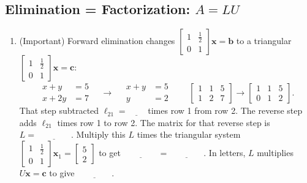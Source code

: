 \documentclass[14pt, a4paper]{article}
\begin{document}
\subsection{Elimination = Factorization: $A=LU$}
\begin{enumerate}
    \item (Important) Forward elimination changes $\begin{bmatrix}1 & \frac12 \\ 0 & 1\end{bmatrix}\boldsymbol{x} = \boldsymbol{b}$ to a triangular $\begin{bmatrix}1 & \frac12 \\ 0 & 1\end{bmatrix}\boldsymbol{x} = \boldsymbol{c}$:
          \[
              \begin{aligned}
                  x + y  & = 5 \\
                  x + 2y & = 7
              \end{aligned}
              \quad\longrightarrow\quad
              \begin{aligned}
                  x + y & = 5 \\
                  y     & = 2
              \end{aligned}
              \qquad
              \begin{bmatrix}1 & 1 & 5 \\ 1 & 2 & 7\end{bmatrix}
              \longrightarrow
              \begin{bmatrix}1 & 1 & 5 \\ 0 & 1 & 2\end{bmatrix}.
          \]
          That step subtracted $\ell_{21} = \underline{\hspace{2em}}$ times row 1 from row 2. The reverse step adds $\ell_{21}$ times row 1 to row 2. The matrix for that reverse step is $L = \underline{\hspace{4em}}$. Multiply this $L$ times the triangular system $\begin{bmatrix}1 & \frac12 \\ 0 & 1\end{bmatrix}\boldsymbol{x}_1 = \begin{bmatrix}5 \\ 2\end{bmatrix}$ to get $\underline{\hspace{4em}} = \underline{\hspace{4em}}$. In letters, $L$ multiplies $U\boldsymbol{x} = \boldsymbol{c}$ to give $\underline{\hspace{4em}}$.


\end{enumerate}
\end{document}

